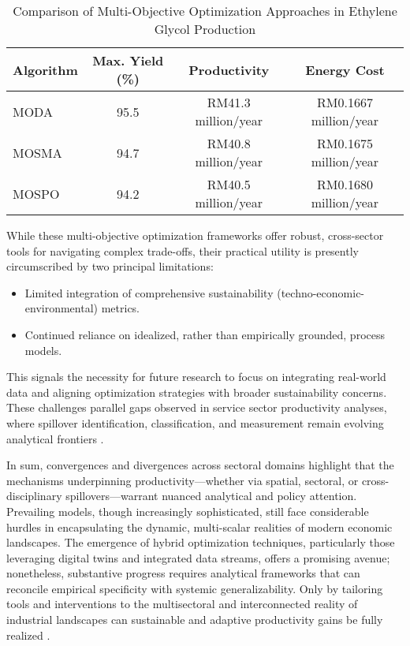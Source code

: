 \documentclass[sigconf]{acmart}
\begin{document}
\begin{table*}[htbp]
\centering
\caption{Comparison of Multi-Objective Optimization Approaches in Ethylene Glycol Production}
\label{tab:ethylene_glycol_optimization}
\begin{adjustbox}{max width=\textwidth}
\begin{tabular}{lccc}
\toprule
\textbf{Algorithm} & \textbf{Max. Yield (\%)} & \textbf{Productivity} & \textbf{Energy Cost} \\
\midrule
MODA  & 95.5 & RM41.3 million/year & RM0.1667 million/year \\
MOSMA & 94.7 & RM40.8 million/year & RM0.1675 million/year \\
MOSPO & 94.2 & RM40.5 million/year & RM0.1680 million/year \\
\bottomrule
\end{tabular}
\end{adjustbox}
\end{table*}

While these multi-objective optimization frameworks offer robust, cross-sector tools for navigating complex trade-offs, their practical utility is presently circumscribed by two principal limitations:
\begin{itemize}
    \item Limited integration of comprehensive sustainability (techno-economic-environmental) metrics.
    \item Continued reliance on idealized, rather than empirically grounded, process models.
\end{itemize}
This signals the necessity for future research to focus on integrating real-world data and aligning optimization strategies with broader sustainability concerns. These challenges parallel gaps observed in service sector productivity analyses, where spillover identification, classification, and measurement remain evolving analytical frontiers \cite{ref75}.

In sum, convergences and divergences across sectoral domains highlight that the mechanisms underpinning productivity—whether via spatial, sectoral, or cross-disciplinary spillovers—warrant nuanced analytical and policy attention. Prevailing models, though increasingly sophisticated, still face considerable hurdles in encapsulating the dynamic, multi-scalar realities of modern economic landscapes. The emergence of hybrid optimization techniques, particularly those leveraging digital twins and integrated data streams, offers a promising avenue; nonetheless, substantive progress requires analytical frameworks that can reconcile empirical specificity with systemic generalizability. Only by tailoring tools and interventions to the multisectoral and interconnected reality of industrial landscapes can sustainable and adaptive productivity gains be fully realized \cite{ref74}\cite{ref75}\cite{ref88}.
\end{document}
